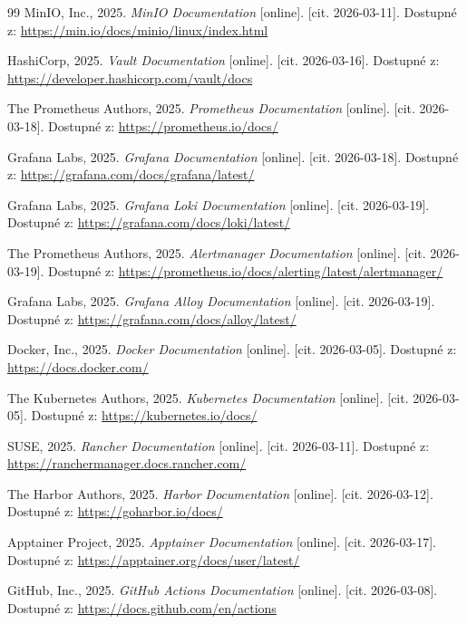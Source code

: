 \documentclass[a4paper, 11pt]{article}
\newcommand{\docurl}[1]{\textcolor{cblue}{\url{#1}}}
\begin{document}
\begin{thebibliography}{99}
 MinIO, Inc., 2025. \textit{MinIO Documentation} [online]. [cit. 2026-03-11]. Dostupné z: \docurl{https://min.io/docs/minio/linux/index.html}

 HashiCorp, 2025. \textit{Vault Documentation} [online]. [cit. 2026-03-16]. Dostupné z: \docurl{https://developer.hashicorp.com/vault/docs}

 The Prometheus Authors, 2025. \textit{Prometheus Documentation} [online]. [cit. 2026-03-18]. Dostupné z: \docurl{https://prometheus.io/docs/}

 Grafana Labs, 2025. \textit{Grafana Documentation} [online]. [cit. 2026-03-18]. Dostupné z: \docurl{https://grafana.com/docs/grafana/latest/}

 Grafana Labs, 2025. \textit{Grafana Loki Documentation} [online]. [cit. 2026-03-19]. Dostupné z: \docurl{https://grafana.com/docs/loki/latest/}

 The Prometheus Authors, 2025. \textit{Alertmanager Documentation} [online]. [cit. 2026-03-19]. Dostupné z: \docurl{https://prometheus.io/docs/alerting/latest/alertmanager/}

 Grafana Labs, 2025. \textit{Grafana Alloy Documentation} [online]. [cit. 2026-03-19]. Dostupné z: \docurl{https://grafana.com/docs/alloy/latest/}

 Docker, Inc., 2025. \textit{Docker Documentation} [online]. [cit. 2026-03-05]. Dostupné z: \docurl{https://docs.docker.com/}

 The Kubernetes Authors, 2025. \textit{Kubernetes Documentation} [online]. [cit. 2026-03-05]. Dostupné z: \docurl{https://kubernetes.io/docs/}

 SUSE, 2025. \textit{Rancher Documentation} [online]. [cit. 2026-03-11]. Dostupné z: \docurl{https://ranchermanager.docs.rancher.com/}

 The Harbor Authors, 2025. \textit{Harbor Documentation} [online]. [cit. 2026-03-12]. Dostupné z: \docurl{https://goharbor.io/docs/}

 Apptainer Project, 2025. \textit{Apptainer Documentation} [online]. [cit. 2026-03-17]. Dostupné z: \docurl{https://apptainer.org/docs/user/latest/}

 GitHub, Inc., 2025. \textit{GitHub Actions Documentation} [online]. [cit. 2026-03-08]. Dostupné z: \docurl{https://docs.github.com/en/actions}


\end{thebibliography}
\end{document}
